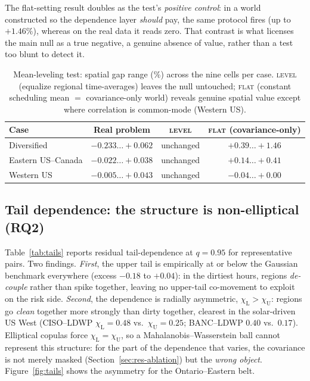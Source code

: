 \documentclass[12pt]{article}
\newcommand{\chiU}{\chi_{\mathrm{U}}}
\newcommand{\chiL}{\chi_{\mathrm{L}}}
\begin{document}
The flat-setting result doubles as the test's \emph{positive control}: in a world
constructed so the dependence layer \emph{should} pay, the same protocol fires (up to
$+1.46\%$), whereas on the real data it reads zero. That contrast is what licenses the
main null as a true negative, a genuine absence of value, rather than a test too blunt to
detect it.

\begin{table}[t]
\centering\small
\caption{Mean-leveling test: spatial gap range (\%) across the nine cells per case.
\textsc{level} (equalize regional time-averages) leaves the null untouched;
\textsc{flat} (constant scheduling mean $=$ covariance-only world) reveals genuine
spatial value except where correlation is common-mode (Western US).}
\label{tab:ablation}
\begin{tabular}{lccc}
\toprule
Case & Real problem & \textsc{level} & \textsc{flat} (covariance-only)\\
\midrule
Diversified & $-0.233\ldots+0.062$ & unchanged & $+0.39\ldots+1.46$\\
Eastern US--Canada      & $-0.022\ldots+0.038$ & unchanged & $+0.14\ldots+0.41$\\
Western US   & $-0.005\ldots+0.043$ & unchanged & $-0.04\ldots+0.00$\\
\bottomrule
\end{tabular}
\end{table}

\subsection{Tail dependence: the structure is non-elliptical
(RQ2)}\label{sec:res-tails}
Table~\ref{tab:tails} reports residual tail-dependence at $q=0.95$ for
representative pairs. Two findings. \emph{First}, the upper tail is empirically at
or below the Gaussian benchmark everywhere (excess $-0.18$ to $+0.04$): in the
dirtiest hours, regions \emph{de-couple} rather than spike together, leaving
no upper-tail co-movement to exploit on the risk side.
\emph{Second}, the dependence is radially asymmetric, $\chiL>\chiU$: regions go
\emph{clean} together more strongly than dirty together, clearest in the
solar-driven US West (CISO--LDWP $\chiL=0.48$ vs.\ $\chiU=0.25$; BANC--LDWP $0.40$
vs.\ $0.17$). Elliptical copulas force $\chiL=\chiU$, so a
Mahalanobis--Wasserstein ball cannot represent this structure: for the part of
the dependence that varies, the covariance is not merely masked
(Section~\ref{sec:res-ablation}) but the \emph{wrong object}.
Figure~\ref{fig:tails} shows the asymmetry for the Ontario--Eastern belt.
\end{document}
